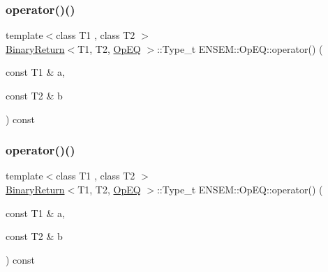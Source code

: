 \subsubsection{\texorpdfstring{operator()()}{operator()()}\hspace{0.1cm}{\footnotesize\ttfamily [1/3]}}
{\footnotesize\ttfamily template$<$class T1 , class T2 $>$ \\
\mbox{\hyperlink{structENSEM_1_1BinaryReturn}{Binary\+Return}}$<$T1, T2, \mbox{\hyperlink{structENSEM_1_1OpEQ}{Op\+EQ}} $>$\+::Type\+\_\+t E\+N\+S\+E\+M\+::\+Op\+E\+Q\+::operator() (\begin{DoxyParamCaption}\item[{const T1 \&}]{a,  }\item[{const T2 \&}]{b }\end{DoxyParamCaption}) const\hspace{0.3cm}{\ttfamily [inline]}}

\mbox{\label{structENSEM_1_1OpEQ_a91c7b46e62390256d4a5a7bad129f9b5}} 
\subsubsection{\texorpdfstring{operator()()}{operator()()}\hspace{0.1cm}{\footnotesize\ttfamily [2/3]}}
{\footnotesize\ttfamily template$<$class T1 , class T2 $>$ \\
\mbox{\hyperlink{structENSEM_1_1BinaryReturn}{Binary\+Return}}$<$T1, T2, \mbox{\hyperlink{structENSEM_1_1OpEQ}{Op\+EQ}} $>$\+::Type\+\_\+t E\+N\+S\+E\+M\+::\+Op\+E\+Q\+::operator() (\begin{DoxyParamCaption}\item[{const T1 \&}]{a,  }\item[{const T2 \&}]{b }\end{DoxyParamCaption}) const\hspace{0.3cm}{\ttfamily [inline]}}

\mbox{\label{structENSEM_1_1OpEQ_a91c7b46e62390256d4a5a7bad129f9b5}} 
